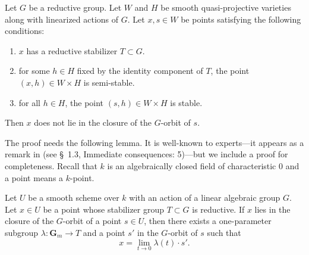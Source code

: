 \documentclass[12pt,reqno]{amsart}
\renewcommand{\k}{k}
\renewcommand{\to}{{\longrightarrow}}
\numberwithin{equation}{section}
\newcommand{\G}{\mathbf G}
\begin{document}
\begin{proposition}\label{prop:gitproduct}
  Let $G$ be a reductive group.
  Let $W$ and $H$ be smooth quasi-projective varieties along with linearized actions of $G$.
  Let $x, s \in W$ be points satisfying the following conditions:
  \begin{enumerate}
  \item $x$ has a reductive stabilizer $T \subset G$.
  \item for some $h \in H$ fixed by the identity component of $T$, the point $(x, h) \in W \times H$ is semi-stable.
  \item for all $h \in H$, the point $(s, h) \in W \times H$ is stable.
  \end{enumerate}
  Then $x$ does not lie in the closure of the $G$-orbit of $s$.
\end{proposition}
The proof needs the following lemma.
It is well-known to experts---it appears as a remark in \cite{alp.hal.ryd:20} (see \S~1.3, Immediate consequences: 5)---but we include a proof for completeness.
Recall that $\k$ is an algebraically closed field of characteristic 0 and a point means a $\k$-point.
\begin{lemma}\label{prop:oneparam}
  Let \(U\) be a smooth scheme over $\k$ with an action of a linear algebraic group $G$.
  Let $x \in U$ be a point whose stabilizer group $T \subset G$ is reductive.
  If $x$ lies in the closure of the $G$-orbit of a point $s \in U$, then there exists a one-parameter subgroup $\lambda \colon \G_m \to T$ and a point $s'$ in the $G$-orbit of $s$ such that
  \[ x = \lim_{t \to 0} \lambda(t) \cdot s'.\]
\end{lemma}
\end{document}
